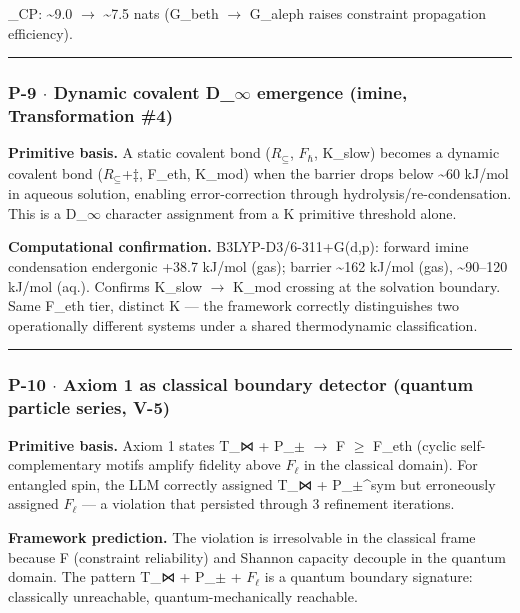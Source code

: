 \documentclass[12pt,a4paper]{article}
\begin{document}
\xi\_CP: \textasciitilde{}9.0 $\rightarrow$ \textasciitilde{}7.5 nats (G\_beth $\rightarrow$ G\_aleph raises constraint propagation efficiency).

\begin{center}
\rule{0.5\textwidth}{0.4pt}
\end{center}

\subsubsection{P-9 $\cdot$ Dynamic covalent D\_$\infty$ emergence (imine, Transformation \#4)}

\textbf{Primitive basis.} A static covalent bond ($R_{\subseteq}$, $F_{\hbar}$, K\_slow) becomes a dynamic covalent bond ($R_{\subseteq}$+‡, F\_eth, K\_mod) when the barrier drops below \textasciitilde{}60 kJ/mol in aqueous solution, enabling error-correction through hydrolysis/re-condensation. This is a D\_$\infty$ character assignment from a K primitive threshold alone.

\textbf{Computational confirmation.} B3LYP-D3/6-311+G(d,p): forward imine condensation endergonic +38.7 kJ/mol (gas); barrier \textasciitilde{}162 kJ/mol (gas), \textasciitilde{}90--120 kJ/mol (aq.). Confirms K\_slow $\rightarrow$ K\_mod crossing at the solvation boundary. Same F\_eth tier, distinct K --- the framework correctly distinguishes two operationally different systems under a shared thermodynamic classification.

\begin{center}
\rule{0.5\textwidth}{0.4pt}
\end{center}

\subsubsection{P-10 $\cdot$ Axiom 1 as classical boundary detector (quantum particle series, V-5)}

\textbf{Primitive basis.} Axiom 1 states T\_⋈ + P\_$\pm$ $\rightarrow$ F $\geq$ F\_eth (cyclic self-complementary motifs amplify fidelity above $F_{\ell}$ in the classical domain). For entangled spin, the LLM correctly assigned T\_⋈ + P\_$\pm$\^{}sym but erroneously assigned $F_{\ell}$ --- a violation that persisted through 3 refinement iterations.

\textbf{Framework prediction.} The violation is irresolvable in the classical frame because F (constraint reliability) and Shannon capacity decouple in the quantum domain. The pattern T\_⋈ + P\_$\pm$ + $F_{\ell}$ is a quantum boundary signature: classically unreachable, quantum-mechanically reachable.
\end{document}
